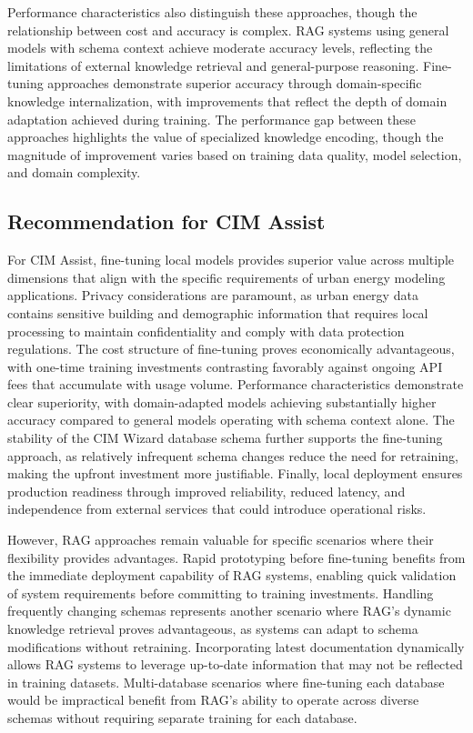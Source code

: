 Performance characteristics also distinguish these approaches, though the relationship between cost and accuracy is complex. RAG systems using general models with schema context achieve moderate accuracy levels, reflecting the limitations of external knowledge retrieval and general-purpose reasoning. Fine-tuning approaches demonstrate superior accuracy through domain-specific knowledge internalization, with improvements that reflect the depth of domain adaptation achieved during training. The performance gap between these approaches highlights the value of specialized knowledge encoding, though the magnitude of improvement varies based on training data quality, model selection, and domain complexity.

\subsection{Recommendation for CIM Assist}

For CIM Assist, fine-tuning local models provides superior value across multiple dimensions that align with the specific requirements of urban energy modeling applications. Privacy considerations are paramount, as urban energy data contains sensitive building and demographic information that requires local processing to maintain confidentiality and comply with data protection regulations. The cost structure of fine-tuning proves economically advantageous, with one-time training investments contrasting favorably against ongoing API fees that accumulate with usage volume. Performance characteristics demonstrate clear superiority, with domain-adapted models achieving substantially higher accuracy compared to general models operating with schema context alone. The stability of the CIM Wizard database schema further supports the fine-tuning approach, as relatively infrequent schema changes reduce the need for retraining, making the upfront investment more justifiable. Finally, local deployment ensures production readiness through improved reliability, reduced latency, and independence from external services that could introduce operational risks.

However, RAG approaches remain valuable for specific scenarios where their flexibility provides advantages. Rapid prototyping before fine-tuning benefits from the immediate deployment capability of RAG systems, enabling quick validation of system requirements before committing to training investments. Handling frequently changing schemas represents another scenario where RAG's dynamic knowledge retrieval proves advantageous, as systems can adapt to schema modifications without retraining. Incorporating latest documentation dynamically allows RAG systems to leverage up-to-date information that may not be reflected in training datasets. Multi-database scenarios where fine-tuning each database would be impractical benefit from RAG's ability to operate across diverse schemas without requiring separate training for each database.

